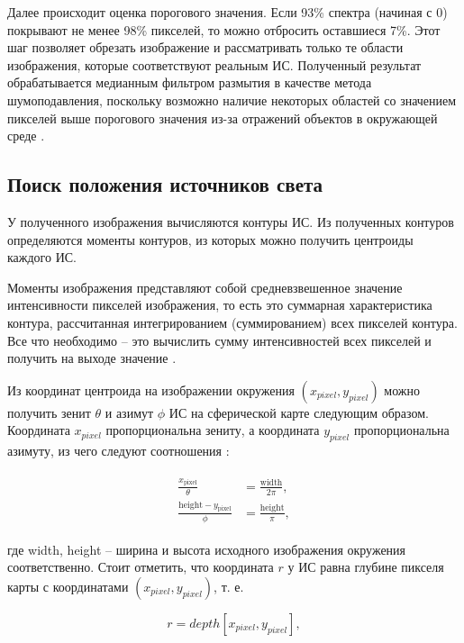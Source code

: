 Далее происходит оценка порогового значения. Если 93\% спектра (начиная с 0) покрывают не менее 98\% пикселей, то можно отбросить оставшиеся 7\%. Этот шаг позволяет обрезать изображение и рассматривать только те области изображения, которые соответствуют реальным ИС. Полученный результат обрабатывается медианным фильтром размытия в качестве метода шумоподавления, поскольку возможно наличие некоторых областей со значением пикселей выше порогового значения из-за отражений объектов в окружающей среде \cite{osti2019real}.

\subsection{Поиск положения источников света}

У полученного изображения вычисляются контуры ИС. Из полученных контуров определяются моменты контуров, из которых можно получить центроиды каждого ИС. 

Моменты изображения представляют собой средневзвешенное значение интенсивности пикселей изображения, то есть это суммарная характеристика контура, рассчитанная интегрированием (суммированием) всех пикселей контура. Все что необходимо -- это вычислить сумму интенсивностей всех пикселей и получить на выходе значение \cite{sns_tras}.

Из координат центроида на изображении окружения $(x_{pixel}, y_{pixel})$ можно получить зенит $\theta$ и азимут $\phi$ ИС на сферической карте следующим образом. Координата $x_{pixel}$ пропорциональна зениту, а координата $y_{pixel}$ пропорциональна азимуту, из чего следуют соотношения \cite{osti2019real}:

\begin{equation}
	\begin{aligned}
		\begin{split}
			\frac{x_{\text{pixel}}}{\theta} &= \frac{\text{width}}{2\pi}, \\
			\frac{\text{height} - y_{\text{pixel}}}{\phi} &= \frac{\text{height}}{\pi}, 
		\end{split}
	\end{aligned}
\end{equation}

где width, height -- ширина и высота исходного изображения окружения соответственно. Стоит отметить, что координата $r$ у ИС равна глубине пикселя карты с координатами $(x_{pixel}, y_{pixel})$, т. е. 

\begin{equation}
	r = depth[x_{pixel}, y_{pixel}],
\end{equation}
 
